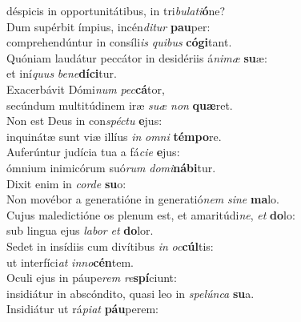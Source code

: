\evenverse déspicis in opportunitátibus, in tri\textit{bu}\textit{la}\textit{ti}\textbf{ó}ne?\\
\oddverse Dum supérbit ímpius, incén\textit{di}\textit{tur} \textbf{pau}per:~\*\\
\oddverse comprehendúntur in consíli\textit{is} \textit{qui}\textit{bus} \textbf{có}\textbf{gi}tant.\\
\evenverse Quóniam laudátur peccátor in desidériis á\textit{ni}\textit{mæ} \textbf{su}æ:~\*\\
\evenverse et iní\textit{quus} \textit{be}\textit{ne}\textbf{dí}\textbf{ci}tur.\\
\oddverse Exacerbávit Dómi\textit{num} \textit{pec}\textbf{cá}tor,~\*\\
\oddverse secúndum multitúdinem iræ \textit{su}\textit{æ} \textit{non} \textbf{quæ}ret.\\
\evenverse Non est Deus in con\textit{spé}\textit{ctu} \textbf{e}jus:~\*\\
\evenverse inquinátæ sunt viæ illíus \textit{in} \textit{om}\textit{ni} \textbf{tém}\textbf{po}re.\\
\oddverse Auferúntur judícia tua a fá\textit{ci}\textit{e} \textbf{e}jus:~\*\\
\oddverse ómnium inimicórum suó\textit{rum} \textit{do}\textit{mi}\textbf{ná}\textbf{bi}tur.\\
\evenverse Dixit enim in \textit{cor}\textit{de} \textbf{su}o:~\*\\
\evenverse Non movébor a generatióne in generatió\textit{nem} \textit{si}\textit{ne} \textbf{ma}lo.\\
\oddverse Cujus maledictióne os plenum est, et amaritúdi\textit{ne}, \textit{et} \textbf{do}lo:~\*\\
\oddverse sub lingua ejus \textit{la}\textit{bor} \textit{et} \textbf{do}lor.\\
\evenverse Sedet in insídiis cum divítibus \textit{in} \textit{oc}\textbf{cúl}tis:~\*\\
\evenverse ut interfíci\textit{at} \textit{in}\textit{no}\textbf{cén}tem.\\
\oddverse Oculi ejus in páupe\textit{rem} \textit{re}\textbf{spí}ciunt:~\*\\
\oddverse insidiátur in abscóndito, quasi leo in \textit{spe}\textit{lún}\textit{ca} \textbf{su}a.\\
\evenverse Insidiátur ut rá\textit{pi}\textit{at} \textbf{páu}perem:~\*\\
